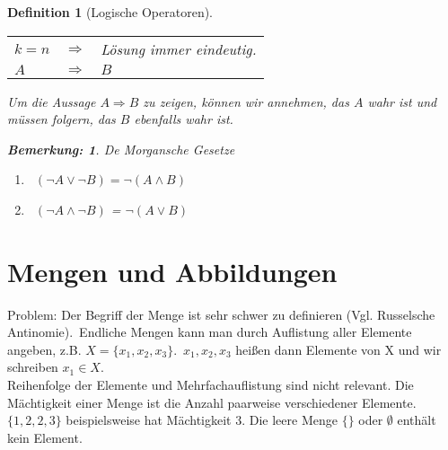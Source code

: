 \documentclass{report}
\newcommand{\IN}[1]{\index{#1|BH}}
\theoremstyle{customrem}
\newtheorem*{bem}{Bemerkung\textnormal:}
\theoremstyle{customdef}
\newtheorem{definition}{Definition}[chapter]
\begin{document}
\begin{definition}[Logische Operatoren]
		\begin{center}
			\begin{tabular}{l c l}
				$k = n$ & $\Rightarrow$ & Lösung immer eindeutig.\\
				$A$ & $\Rightarrow$ &  $B$\\
			\end{tabular}
		\end{center}
		Um die Aussage $A \Rightarrow B$ zu zeigen, können wir annehmen, das $A$ wahr ist und müssen folgern, das $B$ ebenfalls wahr ist.\\
		\begin{bem} De Morgansche Gesetze
			\begin{enumerate}
				\item\ $(\neg A \lor \neg B) = \neg (A \land B)$
				\item\ $(\neg A \land \neg B)$ = $\neg (A \lor B)$
			\end{enumerate}
		\end{bem}
	\end{definition}


\section{Mengen und Abbildungen}
	\IN{Menge}
	Problem: Der Begriff der Menge ist sehr schwer zu definieren (Vgl. Russelsche Antinomie).\
	Endliche Mengen kann man durch Auflistung aller Elemente angeben, z.B. $X = \{x_1, x_2, x_3\}$.\ $x_1, x_2, x_3$ heißen dann Elemente von X und wir schreiben $x_1 \in X$.\\
	Reihenfolge der Elemente und Mehrfachauflistung sind nicht relevant. Die Mächtigkeit einer Menge ist die Anzahl paarweise verschiedener Elemente. $\{1, 2, 2, 3\}$ beispielsweise hat Mächtigkeit $3$.
	Die leere Menge $\{\}$ oder $\emptyset$ enthält kein Element.
\end{document}
